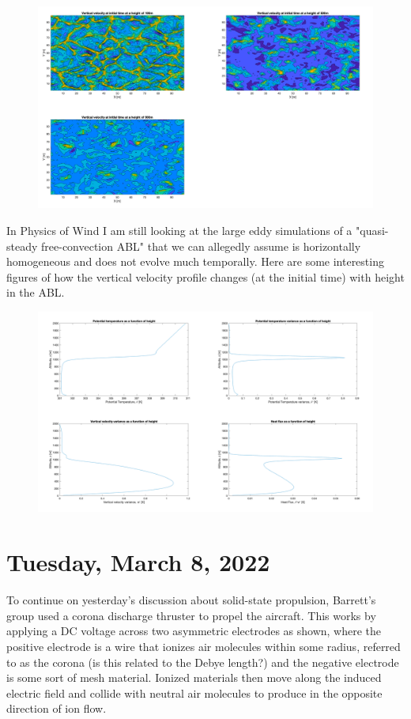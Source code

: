 \documentclass[12pt]{article}
\begin{document}
\begin{figure}[H]
\centering
\includegraphics[width=\linewidth]{images/vertical_velocity_contour.pdf}
\end{figure}

\par
In Physics of Wind I am still looking at the large eddy simulations of a "quasi-steady free-convection ABL" that we can allegedly assume is horizontally homogeneous and does not evolve much temporally. Here are some interesting figures of how the vertical velocity profile changes (at the initial time) with height in the ABL.

\begin{figure}[H]
\centering
\includegraphics[width=\linewidth]{images/ABL_Vertical_Profiles.pdf}
\end{figure}


\section{Tuesday, March 8, 2022}
\par
To continue on yesterday’s discussion about solid-state propulsion, Barrett’s group used a corona discharge thruster to propel the aircraft. This works by applying a DC voltage across two asymmetric electrodes as shown, where the positive electrode is a wire that ionizes air molecules within some radius, referred to as the corona (is this related to the Debye length?) and the negative electrode is some sort of mesh material. Ionized materials then move along the induced electric field and collide with neutral air molecules to produce in the opposite direction of ion flow. 
\end{document}
